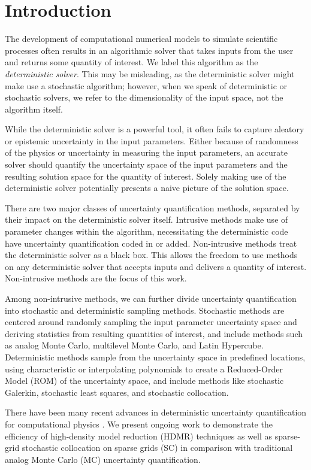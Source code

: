 \documentclass{mc2015}
\begin{document}
\section{Introduction}
The development of computational numerical models to simulate scientific processes often results in an algorithmic solver that takes inputs from the user and returns some quantity of interest.  We label this algorithm as the \emph{deterministic solver}.  This may be misleading, as the deterministic solver might make use a stochastic algorithm; however, when we speak of deterministic or stochastic solvers, we refer to the dimensionality of the input space, not the algorithm itself.

While the deterministic solver is a powerful tool, it often fails to capture aleatory or epistemic uncertainty in the input parameters.  Either because of randomness of the physics or uncertainty in measuring the input parameters, an accurate solver should quantify the uncertainty space of the input parameters and the resulting solution space for the quantity of interest.  Solely making use of the deterministic solver potentially presents a naive picture of the solution space.

There are two major classes of uncertainty quantification methods, separated by their impact on the deterministic solver itself.  Intrusive methods make use of parameter changes within the algorithm, necessitating the deterministic code have uncertainty quantification coded in or added.  Non-intrusive methods treat the deterministic solver as a black box.  This allows the freedom to use methods on any deterministic solver that accepts inputs and delivers a quantity of interest.  Non-intrusive methods are the focus of this work.

Among non-intrusive methods, we can further divide uncertainty quantification into stochastic and deterministic sampling methods.  Stochastic methods are centered around randomly sampling the input parameter uncertainty space and deriving statistics from resulting quantities of interest, and include methods such as analog Monte Carlo, multilevel Monte Carlo, and Latin Hypercube.  Deterministic methods sample from the uncertainty space in predefined locations, using characteristic or interpolating polynomials to create a Reduced-Order Model (ROM) of the uncertainty space, and include methods like stochastic Galerkin, stochastic least squares, and stochastic collocation. 

There have been many recent advances in deterministic uncertainty quantification for computational physics \cite{SCLagrange}.  We present ongoing work to demonstrate the efficiency of high-density model reduction (HDMR) techniques as well as sparse-grid stochastic collocation on sparse grids (SC) \cite{sparseSC} in comparison with traditional analog Monte Carlo (MC) uncertainty quantification.
\end{document}
